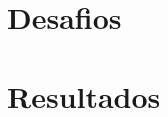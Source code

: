 \documentclass[11pt]{article}
\begin{document}




\section{Desafios}


\section{Resultados}






\end{document}
